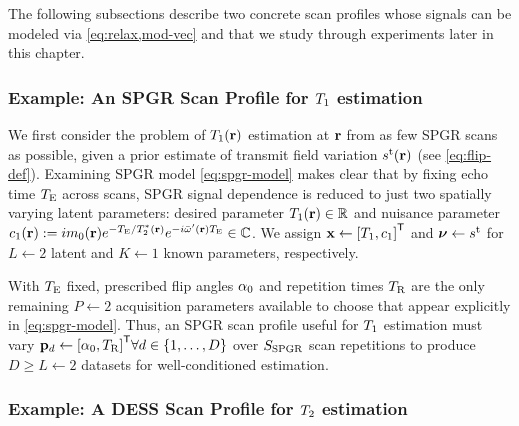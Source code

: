 The following subsections
describe two concrete scan profiles
whose signals can be modeled 
via \eqref{eq:relax,mod-vec} 
and that we study through experiments
later in this chapter.

\subsubsection{Example: An SPGR Scan Profile for $T_1$ estimation}
\label{sss,relax,meth,sig,t1}

We first consider the problem
of $\To\pr$ estimation at $\mathbf{r}$ 
from as few SPGR scans as possible,
given a prior estimate
of transmit field variation $\stx\pr$
(see \eqref{eq:flip-def}).
Examining SPGR model \eqref{eq:spgr-model}
makes clear that 
by fixing echo time $T_\mathrm{E}$ across scans, 
SPGR signal dependence is reduced 
to just two spatially varying latent parameters:
desired parameter $\To\pr \in \real$ and 
nuisance parameter 
$\const{1}\pr := i\mzero\pr e^{-\TE/\Tts\pr} e^{-i\ompmed\pr \TE} \in \complex$.
We assign $\bmx \gets \brac{\To, \const{1}}\tpose$ and $\boldsymbol{\nu} \gets s^{\mathrm{t}}$
for $L \gets 2$ latent 
and $K \gets 1$ known parameters, respectively.

With $T_\mathrm{E}$ fixed, 
prescribed flip angles $\alpha_0$ 
and repetition times $T_\mathrm{R}$ 
are the only remaining $P \gets 2$ 
acquisition parameters
available to choose
that appear explicitly in \eqref{eq:spgr-model}.
Thus, an SPGR scan profile 
useful for $T_1$ estimation 
must vary 
$\bmp_d \gets \brac{\flipnom, \TR}\tpose
\forall d \in \set{1,\dots,D}$
over $S_{\mathrm{SPGR}}$ scan repetitions
to produce $D \geq L \gets 2$ datasets
for well-conditioned estimation.

\subsubsection{Example: A DESS Scan Profile for $T_2$ estimation}
\label{sss,relax,meth,sig,t2}

